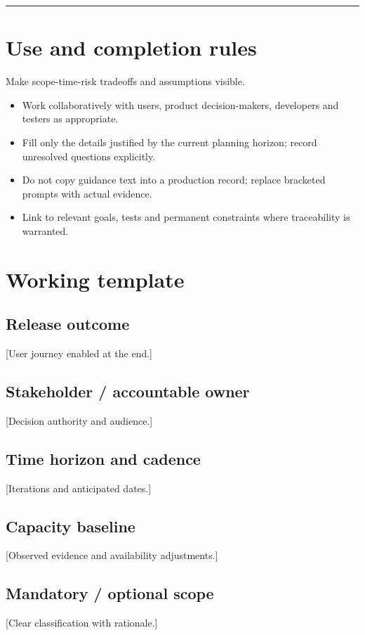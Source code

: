 \documentclass[11pt,letterpaper]{article}
\begin{document}
\tableofcontents\medskip\noindent\rule{\linewidth}{0.4pt}\medskip
\section{Use and completion rules}
Make scope-time-risk tradeoffs and assumptions visible.

\begin{itemize}[leftmargin=*,itemsep=2pt]
\item Work collaboratively with users, product decision-makers, developers and testers as appropriate.
\item Fill only the details justified by the current planning horizon; record unresolved questions explicitly.
\item Do not copy guidance text into a production record; replace bracketed prompts with actual evidence.
\item Link to relevant goals, tests and permanent constraints where traceability is warranted.
\end{itemize}
\section{Working template}
\subsection{Release outcome}
[User journey enabled at the end.]

\subsection{Stakeholder / accountable owner}
[Decision authority and audience.]

\subsection{Time horizon and cadence}
[Iterations and anticipated dates.]

\subsection{Capacity baseline}
[Observed evidence and availability adjustments.]

\subsection{Mandatory / optional scope}
[Clear classification with rationale.]
\end{document}
